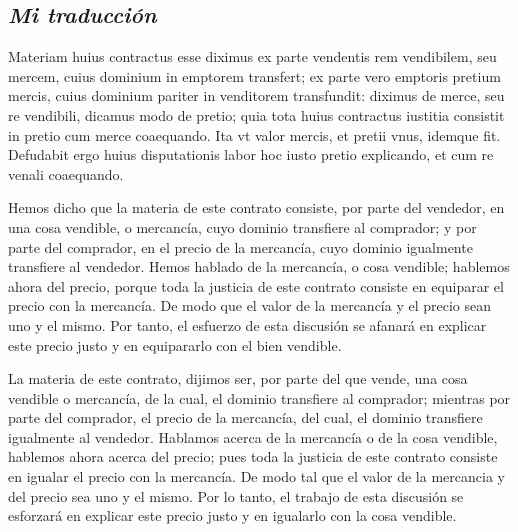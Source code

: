 \documentclass{article}
\begin{document}
\begin{paracol}{3}
\begin{nthcolumn}{2}
    \subsection*{\centering \emph{Mi traducción}}
  \end{nthcolumn}
  \vspace{0.5cm}
  \begin{nthcolumn*}{0} %
    Materiam huius contractus esse diximus ex parte vendentis rem vendibilem, seu mercem, cuius dominium in emptorem transfert; ex parte vero emptoris pretium mercis, cuius dominium pariter in venditorem transfundit: diximus de merce, seu re vendibili, dicamus modo de pretio; quia tota huius contractus iustitia consistit in pretio cum merce coaequando. Ita vt valor mercis, et pretii vnus, idemque fit. Defudabit ergo huius disputationis labor hoc iusto pretio explicando, et cum re venali coaequando.
  \end{nthcolumn*}
  \vspace{0.5cm}
  \begin{nthcolumn}{1} %
    Hemos dicho que la materia de este contrato consiste, por parte del vendedor, en una cosa vendible, o mercancía, cuyo dominio transfiere al comprador; y por parte del comprador, en el precio de la mercancía, cuyo dominio igualmente transfiere al vendedor. Hemos hablado de la mercancía, o cosa vendible; hablemos ahora del precio, porque toda la justicia de este contrato consiste en equiparar el precio con la mercancía. De modo que el valor de la mercancía y el precio sean uno y el mismo. Por tanto, el esfuerzo de esta discusión se afanará en explicar este precio justo y en equipararlo con el bien vendible.
  \end{nthcolumn}
  \vspace{0.5cm}
  \begin{nthcolumn}{2} %
    La materia de este contrato, dijimos ser, por parte del que vende, una cosa vendible o mercancía, de la cual, el dominio transfiere al comprador; mientras por parte del comprador, el precio de la mercancía, del cual, el dominio transfiere igualmente al vendedor. Hablamos acerca de la mercancía o de la cosa vendible, hablemos ahora acerca del precio; pues toda la justicia de este contrato consiste en igualar el precio con la mercancía. De modo tal que el valor de la mercancia y del precio sea uno y el mismo. Por lo tanto, el trabajo de esta discusión se esforzará en explicar este precio justo y en igualarlo con la cosa vendible.
  \end{nthcolumn}
  \vspace{0.5cm}
  \begin{nthcolumn*}{0} %

\end{nthcolumn*}
\end{paracol}
\end{document}
